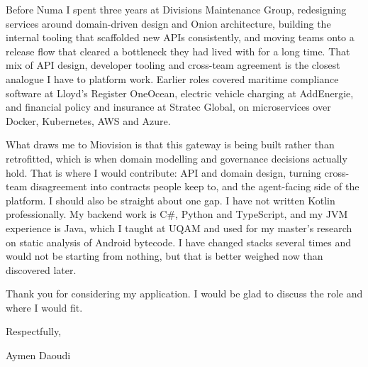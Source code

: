 \documentclass[letterpaper,10pt]{article}
\begin{document}
Before Numa I spent three years at Divisions Maintenance Group, redesigning
services around domain-driven design and Onion architecture, building the
internal tooling that scaffolded new APIs consistently, and moving teams onto a
release flow that cleared a bottleneck they had lived with for a long time. That
mix of API design, developer tooling and cross-team agreement is the closest
analogue I have to platform work. Earlier roles covered maritime compliance
software at Lloyd's Register OneOcean, electric vehicle charging at AddEnergie,
and financial policy and insurance at Stratec Global, on microservices over
Docker, Kubernetes, AWS and Azure.

What draws me to Miovision is that this gateway is being built rather than
retrofitted, which is when domain modelling and governance decisions actually
hold. That is where I would contribute: API and domain design, turning cross-team
disagreement into contracts people keep to, and the agent-facing side of the
platform. I should also be straight about one gap. I have not written Kotlin
professionally. My backend work is C\#, Python and TypeScript, and my JVM
experience is Java, which I taught at UQAM and used for my master's research on
static analysis of Android bytecode. I have changed stacks several times and
would not be starting from nothing, but that is better weighed now than
discovered later.

Thank you for considering my application. I would be glad to discuss the role and
where I would fit.

\vspace{6pt}

Respectfully,

\vspace{4pt}

Aymen Daoudi
\end{document}
